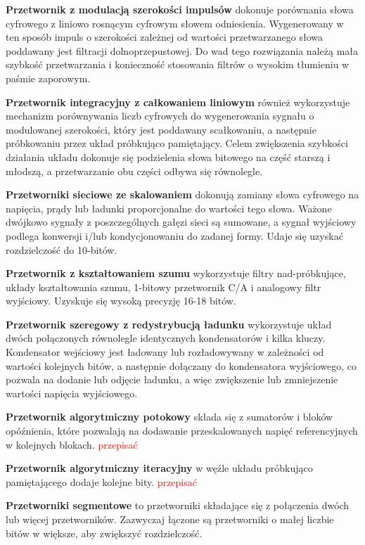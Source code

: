 \documentclass[10pt,a4paper]{report}
\theoremstyle{definition}
\theoremstyle{definition}
\theoremstyle{definition}
\theoremstyle{definition}
\theoremstyle{definition}
\begin{document}
	{	\textbf{Przetwornik z modulacją szerokości impulsów} dokonuje porównania słowa cyfrowego z liniowo rosnącym cyfrowym słowem odniesienia. Wygenerowany w ten sposób impuls o szerokości zależnej od wartości przetwarzanego słowa poddawany jest filtracji dolnoprzepustowej. Do wad tego rozwiązania należą mała szybkość przetwarzania i konieczność stosowania filtrów o wysokim tłumieniu w paśmie zaporowym. }
	
	{	\textbf{Przetwornik integracyjny z całkowaniem liniowym} również wykorzystuje mechanizm porównywania liczb cyfrowych do wygenerowania sygnału o modulowanej szerokości, który jest poddawany scałkowaniu, a następnie próbkowaniu przez układ próbkująco pamiętający. Celem zwiększenia szybkości działania układu dokonuje się podzielenia słowa bitowego na część starszą i młodszą, a przetwarzanie obu części odbywa się równolegle. }
	
	{	\textbf{Przetworniki sieciowe ze skalowaniem} dokonują zamiany słowa cyfrowego na napięcia, prądy lub ładunki proporcjonalne do wartości tego słowa. Ważone dwójkowo sygnały z poszczególnych gałęzi sieci są sumowane, a sygnał wyjściowy podlega konwersji i/lub kondycjonowaniu do zadanej formy. Udaje się uzyskać rozdzielczość do 10-bitów.}
	
	{	\textbf{Przetwornik z kształtowaniem szumu} wykorzystuje filtry nad-próbkujące, układy kształtowania szumu, 1-bitowy przetwornik C/A i analogowy filtr wyjściowy. Uzyskuje się wysoką precyzję 16-18 bitów. }
	
	{	\textbf{Przetwornik szeregowy z redystrybucją ładunku} wykorzystuje układ dwóch połączonych równolegle identycznych kondensatorów i kilka kluczy. Kondensator wejściowy jest ładowany lub rozładowywany w zależności od wartości kolejnych bitów, a następnie dołączany do kondensatora wyjściowego, co pozwala na dodanie lub odjęcie ładunku, a więc zwiększenie lub zmniejszenie wartości napięcia wyjściowego.
	}
	
	{	\textbf{Przetwornik algorytmiczny potokowy} składa się z sumatorów i bloków opóźnienia, które pozwalają na dodawanie przeskalowanych napięć referencyjnych w kolejnych blokach. \textcolor{red}{przepisać} }

	{	\textbf{Przetwornik algorytmiczny iteracyjny} w węźle układu próbkująco pamiętającego dodaje kolejne bity. \textcolor{red}{przepisać} }

	{ 	\textbf{Przetworniki segmentowe} to przetworniki składające się z połączenia dwóch lub więcej przetworników. Zazwyczaj łączone są przetworniki o małej liczbie bitów w większe, aby zwiększyć rozdzielczość. }
\end{document}
